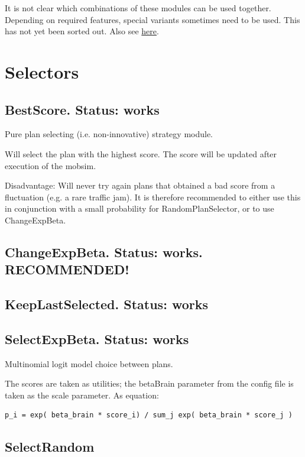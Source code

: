 It is not clear which combinations of these modules can be used  together. Depending on required features, special variants sometimes  need to be used. This has not yet been sorted out. Also see \href{http://matsim.org/node/690}{here}.


\vfill\eject
\section{Selectors}

\subsection{BestScore.  Status: works}

Pure plan selecting (i.e. non-innovative) strategy module.

Will select the plan with the highest score. The score will be updated after execution of the mobsim.

Disadvantage: Will never try again plans that obtained a bad score  from a fluctuation (e.g. a rare traffic jam). It is therefore  recommended to either use this in conjunction with a small probability  for RandomPlanSelector, or to use ChangeExpBeta.

\subsection{ChangeExpBeta. Status: works. RECOMMENDED!}

\subsection{KeepLastSelected. Status: works}

\subsection{SelectExpBeta. Status: works}

Multinomial logit model choice between plans.

The scores are taken as utilities; the betaBrain parameter from the  config file is taken as the scale parameter. As equation:
\begin{verbatim}
p_i = exp( beta_brain * score_i) / sum_j exp( beta_brain * score_j )
\end{verbatim}

\subsection{SelectRandom}

